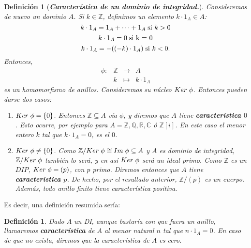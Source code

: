 \documentclass[12pt]{article}
\newtheorem{definition}[theorem]{Definición}
\begin{document}
\begin{definition}[\textbf{\textit{Característica de un dominio de integridad.}}] Consideremos de nuevo un dominio $A$. Si $k \in \mathbb{Z}$, definimos un elemento $k \cdot 1_{A} \in A$: $$k \cdot 1_{A} = 1_{A} + \cdots + 1_{A} \hspace{0.1cm} \text{si $k>0$}$$ $$k \cdot 1_{A} = 0 \hspace{0.1cm} \text{si k = 0}$$ $$k \cdot 1_{A} = -((-k) \cdot 1_{A}) \hspace{0.1cm} \text{si $k<0$}.$$
Entonces, $$\begin{array}{rccl}
\phi \colon &\mathbb{Z}&\longrightarrow &A \\
&k& \longmapsto &k\cdot 1_{A}
\end{array}
$$ es un homomorfismo de anillos. Consideremos su núcleo $Ker \hspace{0.1cm} \phi$. Entonces pueden darse dos casos: \begin{enumerate}
\item $Ker \hspace{0.1cm} \phi = \lbrace 0 \rbrace$. Entonces $\mathbb{Z} \subseteq A$ vía $\phi$, y diremos que $A$ tiene \textbf{característica $0$}. Esto ocurre, por ejemplo para $A = \mathbb{Z}, \mathbb{Q}, \mathbb{R}, \mathbb{C}$ ó $\mathbb{Z}[i]$. En este caso el menor entero $k$ tal que $k \cdot 1_{A} = 0$, es el $0$.
\item $Ker \hspace{0.1cm} \phi \neq \lbrace 0 \rbrace$. Como $\mathbb{Z}/Ker \hspace{0.1cm} \phi \cong Im \hspace{0.1cm} \phi \subseteq A$ y $A$ es dominio de integridad, $\mathbb{Z}/Ker \hspace{0.1cm} \phi$ también lo será, y en así $Ker \hspace{0.1cm} \phi$ será un ideal primo. Como $\mathbb{Z}$ es un $DIP$, $Ker \hspace{0.1cm} \phi = (p)$, con $p$ primo. Diremos entonces que $A$ tiene \textbf{característica $p$}. De hecho, por el resultado anterior, $\mathbb{Z}/(p)$ es un cuerpo. Además, todo anillo finito tiene característica positiva.
\end{enumerate}
\end{definition}

Es decir, una definición resumida sería: 

\begin{definition}Dado $A$ un DI, aunque bastaría con que fuera un anillo, llamaremos \textbf{característica} de $A$ al menor natural $n$ tal que $n\cdot 1_A = 0$. En caso de que no exista, diremos que la característica de $A$ es cero.
\end{definition}
\end{document}
